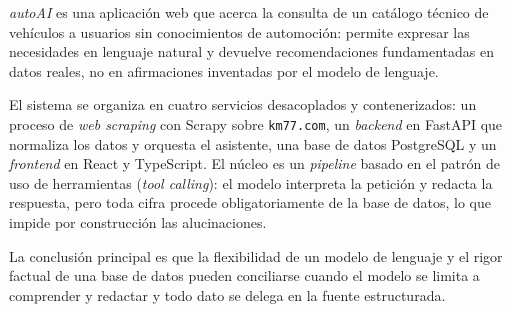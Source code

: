 \emph{autoAI} es una aplicación web que acerca la consulta de un catálogo técnico
de vehículos a usuarios sin conocimientos de automoción: permite expresar las
necesidades en lenguaje natural y devuelve recomendaciones fundamentadas en datos
reales, no en afirmaciones inventadas por el modelo de lenguaje.

El sistema se organiza en cuatro servicios desacoplados y contenerizados: un
proceso de \emph{web scraping} con Scrapy sobre \texttt{km77.com}, un
\emph{backend} en FastAPI que normaliza los datos y orquesta el asistente, una
base de datos PostgreSQL y un \emph{frontend} en React y TypeScript. El núcleo es
un \emph{pipeline} basado en el patrón de uso de herramientas (\emph{tool
calling}): el modelo interpreta la petición y redacta la respuesta, pero toda
cifra procede obligatoriamente de la base de datos, lo que impide por
construcción las alucinaciones.

La conclusión principal es que la flexibilidad de un modelo de lenguaje y el
rigor factual de una base de datos pueden conciliarse cuando el modelo se limita
a comprender y redactar y todo dato se delega en la fuente estructurada.
